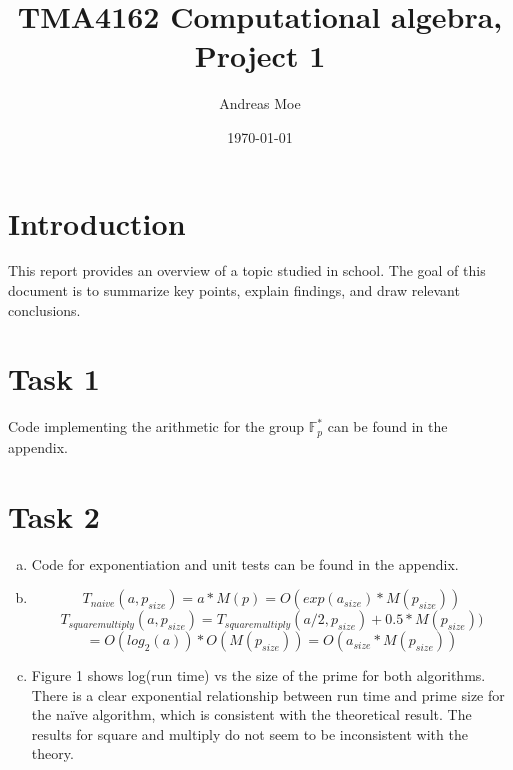 \documentclass[12pt,a4paper]{article}
\title{TMA4162 Computational algebra, Project 1}
\author{Andreas Moe}
\date{\today}
\begin{document}
\maketitle

\section*{Introduction}
This report provides an overview of a topic studied in school. The goal of this document is to summarize key points, explain findings, and draw relevant conclusions.

\section*{Task 1}
Code implementing the arithmetic for the group \(\mathbb{F}_p^*\) can be found in the appendix.

\section*{Task 2}

\begin{enumerate}[a)]
    \item Code for exponentiation and unit tests can be found in the appendix.
    \item 
\[{T_{naive}}(a, p_{size}) = a*M(p) = O(exp(a_{size})*M(p_{size}))\]
\[{T_{squaremultiply}}(a, p_{size}) = {T_{squaremultiply}}(a/2, p_{size})+0.5*M(p_{size}))\]
\[= O(log_2(a))*O(M(p_{size}))=O(a_{size}*M(p_{size}))\]

    \item Figure 1 shows log(run time) vs the size of the prime for both algorithms. There is a clear exponential relationship between run time and prime size for the naïve algorithm, which is consistent with the theoretical result. The results for square and multiply do not seem to be inconsistent with the theory.
\end{enumerate}
\end{document}
